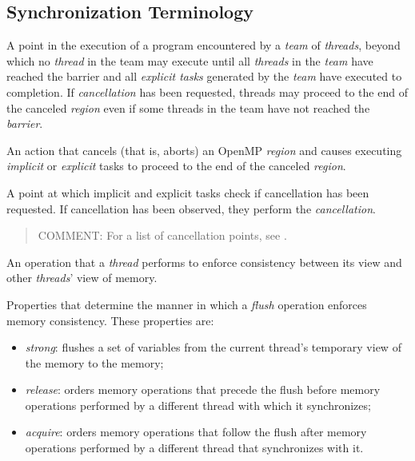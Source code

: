 %
%
\subsection{Synchronization Terminology}
\label{subsec:Synchronization Terminology}
\glossarydefstart
A point in the execution of a program encountered by a \emph{team} of \emph{threads}, beyond
which no \emph{thread} in the team may execute until all \emph{threads} in the \emph{team} have
reached the barrier and all \emph{explicit tasks} generated by the \emph{team} have executed to
completion. If \emph{cancellation} has been requested, threads may proceed to the end of
the canceled \emph{region} even if some threads in the team have not reached the \emph{barrier}.
\glossarydefend

\glossarydefstart
An action that cancels (that is, aborts) an OpenMP \emph{region} and causes executing
\emph{implicit} or \emph{explicit} tasks to proceed to the end of the canceled \emph{region}.
\glossarydefend

\glossarydefstart
A point at which implicit and explicit tasks check if cancellation has been
requested. If cancellation has been observed, they perform the \emph{cancellation}.

\begin{quote}
COMMENT: For a list of cancellation points, see .
\end{quote}
\glossarydefend
\bigskip

\glossarydefstart
An operation that a \emph{thread} performs to enforce consistency between its
view and other \emph{threads}' view of memory.
\glossarydefend

\glossarydefstart
Properties that determine the manner in which a \emph{flush} operation enforces
memory consistency. These properties are:
\begin{itemize}
    \item \emph{strong}: flushes a set of variables from the current thread's
        temporary view of the memory to the memory;
    \item \emph{release}: orders memory operations that precede the flush
        before memory operations performed by a different thread with which it
        synchronizes;
    \item \emph{acquire}: orders memory operations that follow the flush after
        memory operations performed by a different thread that synchronizes
        with it.
\end{itemize}

